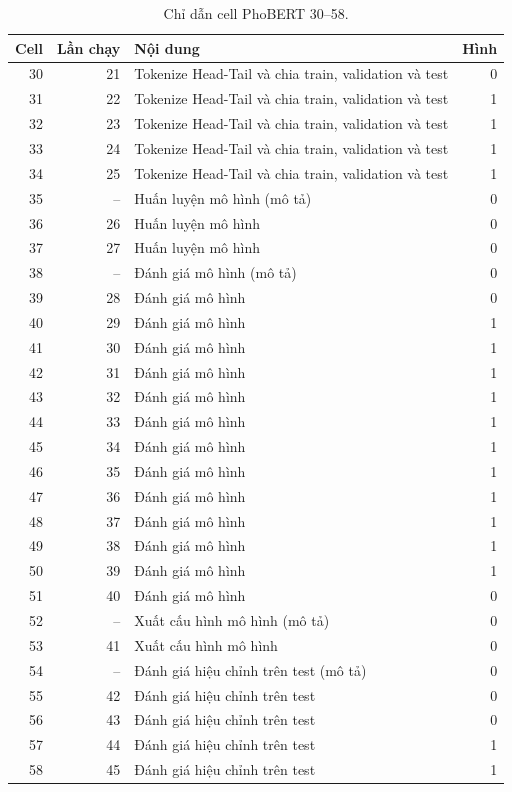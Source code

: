 \begin{table}[H]\centering\small\caption{Chỉ dẫn cell PhoBERT 30--58.}
\begin{tabular}{r r p{87mm} r}\toprule Cell & Lần chạy & Nội dung & Hình\\\midrule
30 & 21 & Tokenize Head-Tail và chia train, validation và test & 0\\
31 & 22 & Tokenize Head-Tail và chia train, validation và test & 1\\
32 & 23 & Tokenize Head-Tail và chia train, validation và test & 1\\
33 & 24 & Tokenize Head-Tail và chia train, validation và test & 1\\
34 & 25 & Tokenize Head-Tail và chia train, validation và test & 1\\
35 & -- & Huấn luyện mô hình (mô tả) & 0\\
36 & 26 & Huấn luyện mô hình & 0\\
37 & 27 & Huấn luyện mô hình & 0\\
38 & -- & Đánh giá mô hình (mô tả) & 0\\
39 & 28 & Đánh giá mô hình & 0\\
40 & 29 & Đánh giá mô hình & 1\\
41 & 30 & Đánh giá mô hình & 1\\
42 & 31 & Đánh giá mô hình & 1\\
43 & 32 & Đánh giá mô hình & 1\\
44 & 33 & Đánh giá mô hình & 1\\
45 & 34 & Đánh giá mô hình & 1\\
46 & 35 & Đánh giá mô hình & 1\\
47 & 36 & Đánh giá mô hình & 1\\
48 & 37 & Đánh giá mô hình & 1\\
49 & 38 & Đánh giá mô hình & 1\\
50 & 39 & Đánh giá mô hình & 1\\
51 & 40 & Đánh giá mô hình & 0\\
52 & -- & Xuất cấu hình mô hình (mô tả) & 0\\
53 & 41 & Xuất cấu hình mô hình & 0\\
54 & -- & Đánh giá hiệu chỉnh trên test (mô tả) & 0\\
55 & 42 & Đánh giá hiệu chỉnh trên test & 0\\
56 & 43 & Đánh giá hiệu chỉnh trên test & 0\\
57 & 44 & Đánh giá hiệu chỉnh trên test & 1\\
58 & 45 & Đánh giá hiệu chỉnh trên test & 1\\
\bottomrule\end{tabular}\end{table}
